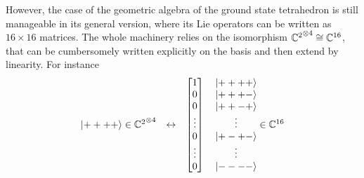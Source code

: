 However, the case of the geometric algebra of the ground state tetrahedron is still manageable in its general version, where its Lie operators can be written as \(16 \times 16\) matrices.
The whole machinery relies on the isomorphism ${\mathbb{C}^{2}}^{\otimes 4}\cong\mathbb{C}^{16}$, that can be cumbersomely written explicitly on the basis and then extend by linearity. For instance
$$\begin{matrix}
    \left| ++++ \right >\in{\mathbb{C}^2}^{\otimes4}&\leftrightarrow&\begin{bmatrix}
    1\\
    0\\
    0\\
    \vdots\\
    0\\
    \vdots\\
    0
\end{bmatrix}\quad\begin{matrix}
    \left| ++++ \right >\\
    \left| +++- \right >\\
    \left| ++-+ \right >\\
    \vdots\\
    \left| +-+- \right >\\
    \vdots\\
    \left| ---- \right >
\end{matrix}\in\mathbb{C}^{16}
\end{matrix}$$

